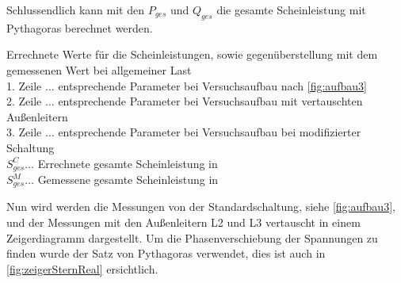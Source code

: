 \documentclass[12pt,english,ngerman]{scrartcl}
\begin{document}
Schlussendlich kann mit den $P_{ges}$ und $Q_{ges}$ die gesamte Scheinleistung
mit Pythagoras berechnet werden.

\begin{table}[H]
	\caption[Errechnete Werte für die Scheinleistungen bei allgemeiner Last] { Errechnete
		Werte für die Scheinleistungen, sowie gegenüberstellung mit dem gemessenen Wert
		bei allgemeiner Last                                            \\
		1. Zeile $\dots$ entsprechende Parameter bei Versuchsaufbau nach
		\autoref{fig:aufbau3}                                           \\
		2. Zeile $\dots$ entsprechende Parameter bei Versuchsaufbau mit vertauschten
		Außenleitern                                                    \\
		3. Zeile $\dots$ entsprechende Parameter bei Versuchsaufbau bei modifizierter
		Schaltung                                                       \\
		$S_{ges}^C \dots$ Errechnete gesamte Scheinleistung in \si{\VA} \\
		$S_{ges}^M \dots$ Gemessene gesamte Scheinleistung in \si{\VA}  \\
	}\label{tab:scheinleistung}
	\centering
	
\end{table}

Nun wird werden die Messungen von der Standardschaltung, siehe
\autoref{fig:aufbau3}, und der Messungen mit den Außenleitern L2 und L3
vertauscht in einem Zeigerdiagramm dargestellt. Um die Phasenverschiebung der
Spannungen zu finden wurde der Satz von Pythagoras verwendet, dies ist auch in
\autoref{fig:zeigerSternReal} ersichtlich.
\end{document}

